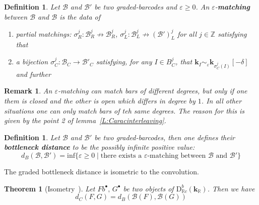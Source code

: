 \documentclass[a4paper, english, 11pt]{article}
\newcommand{\kk}[0]{\textbf{k}}
\newcommand{\0}{\vec{0}}
\newcommand{\R}[0]{\mathbb{R}}
\newcommand{\Z}[0]{\mathbb{Z}}
\newcommand{\B}[0]{\mathcal{B}}
\newcommand{\D}[0]{\text{D}}
\newtheorem{remark}[prop]{Remark}
\newtheorem{defi}[prop]{Definition}
\newtheorem{thm}[prop]{Theorem}
\begin{document}
\begin{defi}\label{D:Epsilonmatching}
Let $\B$ and $\B'$ be two graded-barcodes and $\varepsilon \geq 0$. An $\varepsilon$-\textbf{matching} between $\B$ and $\B$ is the data of
\begin{enumerate}
\item partial matchings: $\sigma_R^j: \B^j_R \not \to \B_R^j$, $\sigma_L^j: \B^j_L \not \to (\B')_L^j$ for all $j\in \Z$
satisfying that 
\item a \emph{bijection} $\sigma^j_C :  \B_C \longrightarrow \B'_C$ satisfying,  for any $I \in B^j_C $, that  $\kk_I \sim_\varepsilon \kk_{\sigma^j_C(I)}[-\delta]$ and further 
\end{enumerate}
\end{defi}
\begin{remark}
 An $\varepsilon$-matching can match bars of different degrees, but only if one them is closed and the other is open which differs in degree by $1$. In all other situations one can only match bars of teh same degrees. The reason for this is given by the point 2 of lemma~\ref{L:Caracinterleaving}.
\end{remark}

\begin{defi}
Let $\B$ and $\B'$ be two graded-barcodes, then one defines their \textbf{bottleneck distance} to be the possibly infinite positive value: $$d_B(\B,\B') = \text{inf} \{\varepsilon \geq 0 \mid \text{there exists a } \varepsilon  \text{-matching between } \B \text{ and } \B' \} $$
\end{defi}
The graded bottleneck distance is isometric to the convolution.
\begin{thm}[Isometry~\cite{Berk18}]\label{T:DerivedIsometry}
Let $Fb^\bullet,\, G^\bullet$ be two objects of $\D^b_{\R c}(\kk_\R)$. Then we have 
$$ d_C(F,G) =  d_B(\B(F),\B(G))$$
\end{thm} 
\end{document}
